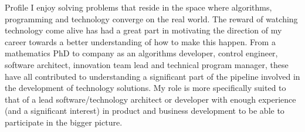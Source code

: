 \documentclass[a4paper,10pt]{article}
\begin{document}
\begin{cvsection}{Profile}
  I enjoy solving problems that reside in the space where algorithms, programming and technology converge on the real world. The reward of watching technology come alive has had a great part in motivating the direction of my career towards a better understanding of how to make this happen. From a mathematics PhD to company as an algorithms developer, control engineer, software architect, innovation team lead and technical program manager, these have all contributed to understanding a significant part of the pipeline involved in the development of technology solutions. My role is more specifically suited to that of a lead software/technology architect or developer with enough experience (and a significant interest) in product and business development to be able to participate in the bigger picture.

\end{cvsection}
\end{document}
